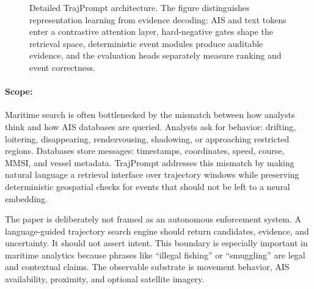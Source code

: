 \documentclass{article}
\makeatletter
\renewcommand{\scriptsize}{\@setfontsize\scriptsize\@viipt\@viiipt}
\renewcommand{\tiny}{\@setfontsize\tiny\@vipt\@viipt}
\makeatother
\begin{document}
\begin{figure}[t]
\caption{Detailed TrajPrompt architecture. The figure distinguishes representation learning from evidence decoding: AIS and text tokens enter a contrastive attention layer, hard-negative gates shape the retrieval space, deterministic event modules produce auditable evidence, and the evaluation heads separately measure ranking and event correctness.}
\label{fig:trajprompt-architecture}
\end{figure}

\paragraph{Scope:}

Maritime search is often bottlenecked by the mismatch between how analysts think and how AIS databases are queried. Analysts ask for behavior: drifting, loitering, disappearing, rendezvousing, shadowing, or approaching restricted regions. Databases store messages: timestamps, coordinates, speed, course, MMSI, and vessel metadata. TrajPrompt addresses this mismatch by making natural language a retrieval interface over trajectory windows while preserving deterministic geospatial checks for events that should not be left to a neural embedding.

The paper is deliberately not framed as an autonomous enforcement system. A language-guided trajectory search engine should return candidates, evidence, and uncertainty. It should not assert intent. This boundary is especially important in maritime analytics because phrases like ``illegal fishing'' or ``smuggling'' are legal and contextual claims. The observable substrate is movement behavior, AIS availability, proximity, and optional satellite imagery.
\end{document}
